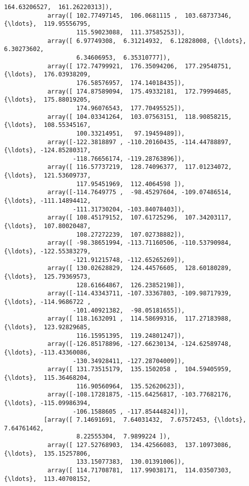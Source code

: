 \documentclass[11pt]{article}
\begin{document}
\begin{Verbatim}[commandchars=\\\{\}]
                    164.63206527,  161.26220313]),
            array([ 102.77497145,  106.0681115 ,  103.68737346, {\ldots},  119.95556795,
                    115.59023088,  111.37585253]),
            array([ 6.97749308,  6.31214932,  6.12828008, {\ldots},  6.30273602,
                    6.34606953,  6.35310777]),
            array([ 172.74799921,  176.35094206,  177.29548751, {\ldots},  176.03938209,
                    176.58576957,  174.14018435]),
            array([ 174.87589094,  175.49332181,  172.79994685, {\ldots},  175.88019205,
                    174.96076543,  177.70495525]),
            array([ 104.03341264,  103.07563151,  118.90858215, {\ldots},  108.55345167,
                    100.33214951,   97.19459489]),
            array([-122.3818897 , -110.20160435, -114.44788897, {\ldots}, -124.85280317,
                   -118.76656174, -119.28763896]),
            array([ 116.57737219,  128.74096377,  117.01234072, {\ldots},  121.53609737,
                    117.95451969,  112.4064598 ]),
            array([-114.7649775 ,  -98.45297604, -109.07486514, {\ldots}, -111.14894412,
                   -111.31730204, -103.84078403]),
            array([ 108.45179152,  107.61725296,  107.34203117, {\ldots},  107.80020487,
                    108.27272239,  107.02738882]),
            array([ -98.38651994, -113.71160506, -110.53790984, {\ldots}, -122.55383279,
                   -121.91215748, -112.65265269]),
            array([ 130.02628829,  124.44576605,  128.60180289, {\ldots},  125.79369573,
                    128.61664867,  126.23852198]),
            array([-114.43343711, -107.33367803, -109.98717939, {\ldots}, -114.9686722 ,
                   -101.40921382,  -98.05181655]),
            array([ 118.1632091 ,  114.58699316,  117.27183988, {\ldots},  123.92829685,
                    116.15951395,  119.24801247]),
            array([-126.85178896, -127.66230134, -124.62589748, {\ldots}, -113.43360086,
                   -130.34928411, -127.28704009]),
            array([ 131.73515179,  135.1502058 ,  104.59405959, {\ldots},  115.36468204,
                    116.90560964,  135.52620623]),
            array([-108.17281875, -115.64256817, -103.77682176, {\ldots}, -115.09986394,
                   -106.1588605 , -117.85444824])],
           [array([ 7.14691691,  7.64031432,  7.67572453, {\ldots},  7.64761462,
                    8.22555304,  7.9899224 ]),
            array([ 127.52768903,  134.42566083,  137.10973086, {\ldots},  135.15257806,
                    133.15077383,  130.01391006]),
            array([ 114.71708781,  117.99038171,  114.03507303, {\ldots},  113.40708152,

\end{Verbatim}
\end{document}
